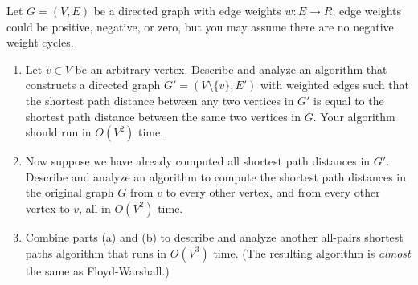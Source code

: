 \documentclass[11pt]{article}
\begin{document}
\begin{problems}
\item
  Let \(G = (V, E)\) be a directed graph with edge weights \(w : E \to R\); edge weights could be
  positive, negative, or zero, but you may assume there are no negative weight cycles.
  \begin{enumerate}
    \item
      Let \(v \in V\) be an arbitrary vertex.
      Describe and analyze an algorithm that constructs a directed graph \(G' = (V \setminus \{v\},
      E')\) with weighted edges such that the shortest path distance between any two vertices in
      \(G'\) is equal to the shortest path distance between the same two vertices in \(G\).
      Your algorithm should run in \(O(V^2)\) time.

    \item
      Now suppose we have already computed all shortest path distances in \(G'\).
      Describe and analyze an algorithm to compute the shortest path distances in the original graph
      \(G\) from \(v\) to every other vertex, and from every other vertex to \(v\), all in
      \(O(V^2)\) time.

    \item
      Combine parts (a) and (b) to describe and analyze another all-pairs shortest paths algorithm
      that runs in \(O(V^3)\) time.
      (The resulting algorithm is \emph{almost} the same as Floyd-Warshall.)
  \end{enumerate}
\end{problems}
\end{document}
